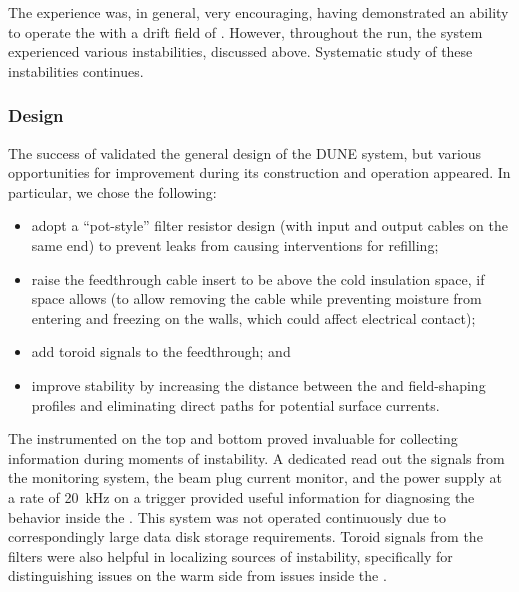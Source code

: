 The   experience was, in general, very encouraging, having demonstrated 
an ability to operate the  with a drift field of \spmaxfield{}. %
However, throughout the run, the system experienced various instabilities, %
discussed above. 
Systematic study of these instabilities continues.

\subsubsection{Design}
\label{sec:fdsp-hv-protodune-lessons-design}

The success of  validated the general design of the DUNE  system, but various opportunities for improvement during its construction and operation appeared. %
 In particular, we chose the following:

\begin{itemize}
\item adopt a ``pot-style'' filter resistor design (with input and output cables on the same end) %
to prevent leaks from causing interventions for refilling;
\item raise the  feedthrough cable insert to be above the cold insulation space, if space allows (to allow removing the cable while preventing moisture from entering and freezing on the walls, which could affect electrical contact);
\item add toroid signals %
to the feedthrough; and
\item improve stability by increasing the distance between the  and field-shaping profiles and eliminating direct paths for potential surface currents.
\end{itemize}


The instrumented  on the top and bottom  proved invaluable for collecting information during moments of instability.
A dedicated  read out the signals from the  monitoring system, the beam plug current monitor, and the power supply at a rate of \SI{20}{kHz} on a trigger provided useful information for diagnosing the  behavior inside the .
This system was not operated continuously due to correspondingly large data disk storage requirements.
Toroid signals from the  filters were also helpful in localizing sources of instability, specifically for distinguishing issues on the warm side from issues inside the .


